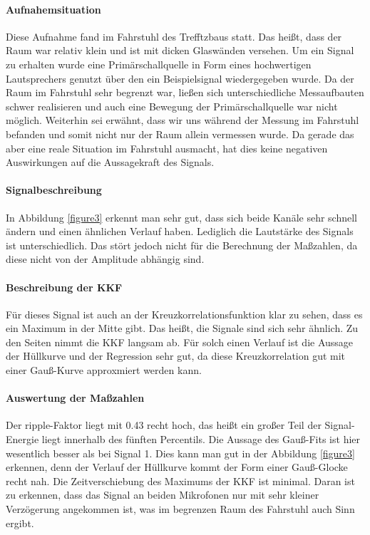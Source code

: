 \paragraph{Aufnahemsituation} Diese Aufnahme fand im Fahrstuhl des Trefftzbaus statt. Das heißt, dass der Raum war relativ klein und ist mit dicken Glaswänden versehen. Um ein Signal zu erhalten wurde eine Primärschallquelle in Form eines hochwertigen Lautsprechers genutzt über den ein Beispielsignal wiedergegeben wurde. Da der Raum im Fahrstuhl sehr begrenzt war, ließen sich unterschiedliche Messaufbauten schwer realisieren und auch eine Bewegung der Primärschallquelle war nicht möglich. Weiterhin sei erwähnt, dass wir uns während der Messung im Fahrstuhl befanden und somit nicht nur der Raum allein vermessen wurde. Da gerade das aber eine reale Situation im Fahrstuhl ausmacht, hat dies keine negativen Auswirkungen auf die Aussagekraft des Signals. 
\paragraph{Signalbeschreibung}
In Abbildung \ref{figure3}  erkennt man sehr gut, dass sich beide Kanäle sehr schnell ändern und einen ähnlichen Verlauf haben. Lediglich die Lautstärke des Signals ist unterschiedlich. Das stört jedoch nicht für die Berechnung der Maßzahlen, da diese nicht von der Amplitude  abhängig sind. 
\paragraph{Beschreibung der KKF}
Für dieses Signal ist auch an der Kreuzkorrelationsfunktion klar zu sehen, dass es ein Maximum in der Mitte gibt. Das heißt, die Signale sind sich sehr ähnlich. Zu den Seiten nimmt die KKF langsam ab. Für solch einen Verlauf ist die Aussage der Hüllkurve und der Regression sehr gut, da diese Kreuzkorrelation gut mit einer Gauß-Kurve approxmiert werden kann.
\paragraph{Auswertung der Maßzahlen}
Der ripple-Faktor liegt mit 0.43 recht hoch, das heißt ein großer Teil der Signal-Energie liegt innerhalb des fünften Percentils. Die Aussage des Gauß-Fits ist hier wesentlich besser als bei Signal 1. Dies kann man gut in der Abbildung \ref{figure3} erkennen, denn der Verlauf der Hüllkurve kommt der Form einer Gauß-Glocke recht nah. Die Zeitverschiebung des Maximums der KKF ist minimal. Daran ist zu erkennen, dass das Signal an beiden Mikrofonen nur mit sehr kleiner Verzögerung angekommen ist, was im begrenzen Raum des Fahrstuhl auch Sinn ergibt.

